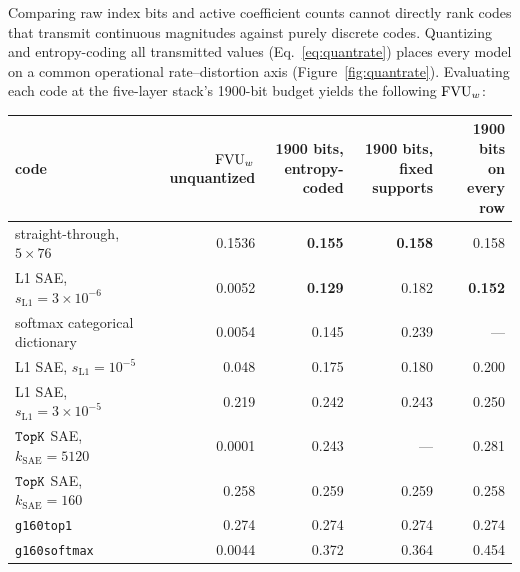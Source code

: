 Comparing raw index bits and active coefficient counts cannot directly
rank codes that transmit continuous magnitudes against purely discrete
codes. Quantizing and entropy-coding all transmitted values
(Eq.~\eqref{eq:quantrate}) places every model on a common operational
rate--distortion axis (Figure~\ref{fig:quantrate}). Evaluating each code
at the five-layer stack's 1900-bit budget yields the following
$\fvu$:

\begin{center}\small\setlength{\tabcolsep}{4pt}
\begin{tabular}{@{}lrrrr@{}}
\toprule
code & \stackhead[r]{$\fvu$\\unquantized} & \stackhead[r]{1900 bits,\\entropy-coded} & \stackhead[r]{1900 bits,\\fixed supports} & \stackhead[r]{1900 bits\\on every row} \\
\midrule
straight-through, $5\times76$ & 0.1536 & \textbf{0.155} & \textbf{0.158} & 0.158 \\
L1 SAE, $s_{\mathrm{L1}}{=}3\times10^{-6}$ & 0.0052 & \textbf{0.129} & 0.182 & \textbf{0.152} \\
softmax categorical dictionary & 0.0054 & 0.145 & 0.239 & --- \\
L1 SAE, $s_{\mathrm{L1}}{=}10^{-5}$ & 0.048 & 0.175 & 0.180 & 0.200 \\
L1 SAE, $s_{\mathrm{L1}}{=}3\times10^{-5}$ & 0.219 & 0.242 & 0.243 & 0.250 \\
$\mathop{\mathtt{TopK}}\limits$ SAE, $k_{\mathrm{SAE}}{=}5120$ & 0.0001 & 0.243 & --- & 0.281 \\
$\mathop{\mathtt{TopK}}\limits$ SAE, $k_{\mathrm{SAE}}{=}160$ & 0.258 & 0.259 & 0.259 & 0.258 \\
\texttt{g160top1} & 0.274 & 0.274 & 0.274 & 0.274 \\
\texttt{g160softmax} & 0.0044 & 0.372 & 0.364 & 0.454 \\
\bottomrule
\end{tabular}
\end{center}

